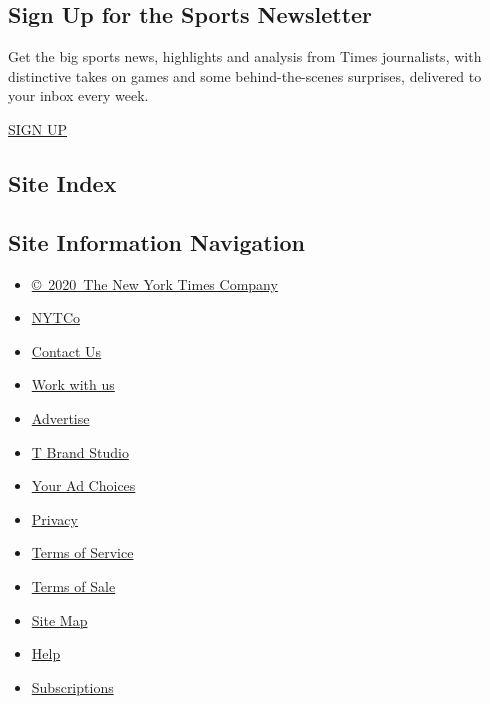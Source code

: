 \hypertarget{sign-up-for-the-sports-newsletter}{%
\subsection{Sign Up for the Sports
Newsletter}\label{sign-up-for-the-sports-newsletter}}

Get the big sports news, highlights and analysis from Times journalists,
with distinctive takes on games and some behind-the-scenes surprises,
delivered to your inbox every week.

\href{/newsletters/signup/SP}{SIGN UP}

\hypertarget{site-index}{%
\subsection{Site Index}\label{site-index}}

\hypertarget{site-information-navigation}{%
\subsection{Site Information
Navigation}\label{site-information-navigation}}

\begin{itemize}
\tightlist
\item
  \href{https://help.nytimes.com/hc/en-us/articles/115014792127-Copyright-notice}{©~2020~The
  New York Times Company}
\end{itemize}

\begin{itemize}
\tightlist
\item
  \href{https://www.nytco.com/}{NYTCo}
\item
  \href{https://help.nytimes.com/hc/en-us/articles/115015385887-Contact-Us}{Contact
  Us}
\item
  \href{https://www.nytco.com/careers/}{Work with us}
\item
  \href{https://nytmediakit.com/}{Advertise}
\item
  \href{http://www.tbrandstudio.com/}{T Brand Studio}
\item
  \href{https://www.nytimes.com/privacy/cookie-policy\#how-do-i-manage-trackers}{Your
  Ad Choices}
\item
  \href{https://www.nytimes.com/privacy}{Privacy}
\item
  \href{https://help.nytimes.com/hc/en-us/articles/115014893428-Terms-of-service}{Terms
  of Service}
\item
  \href{https://help.nytimes.com/hc/en-us/articles/115014893968-Terms-of-sale}{Terms
  of Sale}
\item
  \href{https://spiderbites.nytimes.com}{Site Map}
\item
  \href{https://help.nytimes.com/hc/en-us}{Help}
\item
  \href{https://www.nytimes.com/subscription?campaignId=37WXW}{Subscriptions}
\end{itemize}
